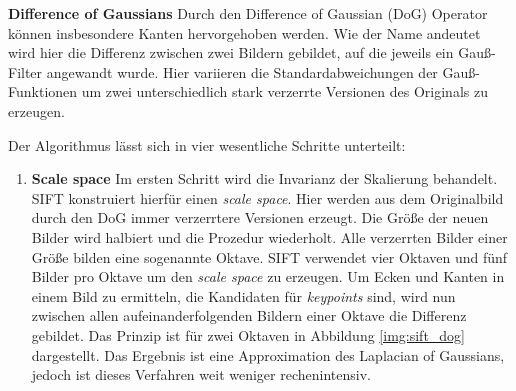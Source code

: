\textbf{Difference of Gaussians}
Durch den Difference of Gaussian (DoG) Operator können insbesondere Kanten hervorgehoben werden. Wie der Name andeutet wird hier die Differenz zwischen zwei Bildern gebildet, auf die jeweils ein Gauß-Filter angewandt wurde. Hier variieren die Standardabweichungen der Gauß-Funktionen um zwei unterschiedlich stark verzerrte Versionen des Originals zu erzeugen.

Der Algorithmus lässt sich in vier wesentliche Schritte unterteilt:

\begin{enumerate}
	\item \textbf{Scale space} Im ersten Schritt wird die Invarianz der Skalierung behandelt. SIFT konstruiert hierfür einen \textit{scale space}. Hier werden aus dem Originalbild durch den DoG immer verzerrtere Versionen erzeugt. Die Größe der neuen Bilder wird halbiert und die Prozedur wiederholt. Alle verzerrten Bilder einer Größe bilden eine sogenannte Oktave. SIFT verwendet vier Oktaven und fünf Bilder pro Oktave um den \textit{scale space} zu erzeugen. Um Ecken und Kanten in einem Bild zu ermitteln, die Kandidaten für \textit{keypoints} sind, wird nun zwischen allen aufeinanderfolgenden Bildern einer Oktave die Differenz gebildet. Das Prinzip ist für zwei Oktaven in Abbildung \ref{img:sift_dog} dargestellt. Das Ergebnis ist eine Approximation des Laplacian of Gaussians, jedoch ist dieses Verfahren weit weniger rechenintensiv. 


\end{enumerate}
